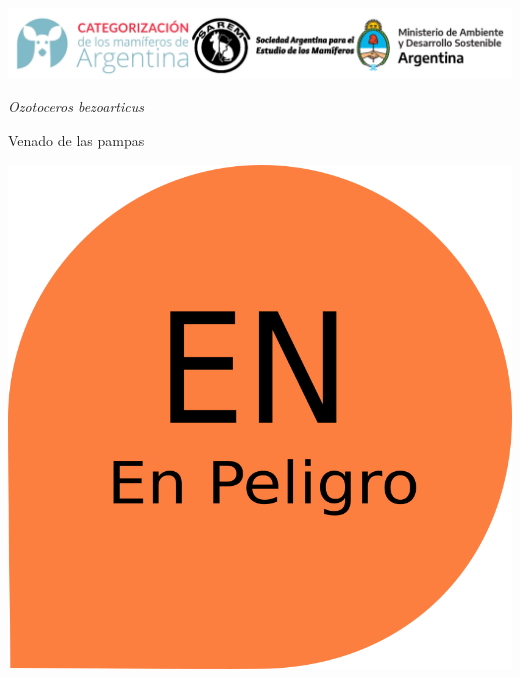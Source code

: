 \documentclass[
  x11names]{article}
\author{}
\date{\vspace{-2.5em}Fecha de creación: 03 April, 2023}
\begin{document}
\setmainfont{Arial}
\setsansfont{Arial}
\setmonofont{Arial}

\newcommand\invisiblesection[1]{%
  \refstepcounter{section}%
  \addcontentsline{toc}{section}{\protect\numberline{\thesection}#1}%
  \sectionmark{#1}}


%
\vspace{-0.4cm}

\includegraphics[width=1\linewidth]{images/Base_info/logo}

\vspace{1cm}

\begin{minipage}{0.7\textwidth}
\vspace{0.3cm}
\fontsize{20}{24}\selectfont\textit{Ozotoceros bezoarticus}

\vspace{0.3cm}
\fontsize{30}{36}\selectfont Venado de las pampas
\end{minipage}
\hspace{0.05\textwidth}
\begin{minipage}{0.25\textwidth}
\includegraphics[width=\textwidth]{images/en.png}
\end{minipage}
\end{document}
